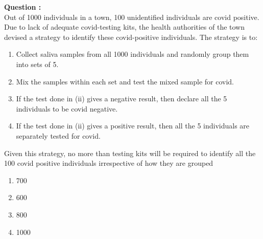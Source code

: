 \documentclass[journal,12pt,onecolumn]{IEEEtran}
\renewcommand{\thefigure}{\theenumi}
\renewcommand{\thetable}{\theenumi}
\begin{document}

\bigskip

\renewcommand{\thefigure}{\arabic{figure}}
\renewcommand{\thetable}{\theenumi}

%

\textbf{Question :}\\
Out of 1000 individuals in a town, 100 unidentified individuals are covid positive.
Due to lack of adequate covid-testing kits, the health authorities of the town devised
a strategy to identify these covid-positive individuals. The strategy is to:
\begin{enumerate}
\item Collect saliva samples from all 1000 individuals and randomly group
them into sets of 5.
\item Mix the samples within each set and test the mixed sample for covid.
\item If the test done in (ii) gives a negative result, then declare all the 5
individuals to be covid negative.
\item If the test done in (ii) gives a positive result, then all the 5 individuals
are separately tested for covid.
\end{enumerate}
Given this strategy, no more than testing kits will be required to identify
all the 100 covid positive individuals irrespective of how they are grouped \\ 
\begin{enumerate}
\item 700
\item 600
\item 800
\item 1000
\end{enumerate}
\end{document}
